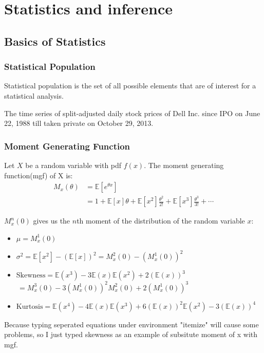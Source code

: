 \section{Statistics and inference}

\subsection{Basics of Statistics}
\subsubsection{Statistical Population}

Statistical population is the set of all possible elements that are of interest for a statistical analysis.
\begin{example}
    The time series of split-adjusted daily stock prices of Dell Inc. since IPO on June 22, 1988 till taken private on October 29, 2013.
\end{example}

\subsubsection{Moment Generating Function}
Let $X$ be a random variable with pdf $f(x)$. The moment generating function(mgf) of X is:
\[
    \begin{aligned}
        M_x(\theta) &= \mathbb{E}[e^{\theta x}]\\
        &= 1 + \mathbb{E}[x]\theta + \mathbb{E}[x^2]\frac{\theta^2}{2!} + \mathbb{E}[x^3]\frac{\theta^3}{3!} + \cdots
    \end{aligned}
\]

$M_x^n(0)$ gives us the $n$th moment of the distribution of the random variable $x$:
\begin{itemize}
    \item $\mu = M_x^1(0)$ 
    \item $\sigma^2 = \mathbb{E}[x^2]-(\mathbb{E}[x])^2 = M_x^2(0) - (M_x^1(0))^2$
    \item $\mathrm{Skewness} =  \mathbb{E}(x^3) - 3 \mathbb{E}(x) \mathbb{E}(x^2) +2 (\mathbb{E}(x))^3$\\
    \phantom{}\qquad \qquad \,$=   M_x^3(0) - 3(M_x^1(0))^2M_x^2(0) + 2(M_x^1(0))^3   $
    \item $\mathrm{Kurtosis} = \mathbb{E}(x^4) - 4\mathbb{E}(x)\mathbb{E}(x^3) + 6(\mathbb{E}(x))^2\mathbb{E}(x^2) - 3(\mathbb{E}(x))^4$
\end{itemize}
\begin{remark}
    Because typing seperated equations under environment "itemize" will cause some problems, so I just typed skewness as an example of subsitute moment of x with mgf.
\end{remark}

